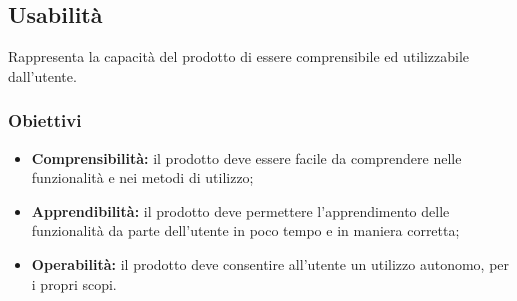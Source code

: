 %
%
%
%


\subsection{Usabilità}
Rappresenta la capacità del prodotto di essere comprensibile ed utilizzabile dall'utente.
\subsubsection{Obiettivi}
\begin{itemize}
	\item \textbf{Comprensibilità:} il prodotto deve essere facile da comprendere nelle funzionalità e nei metodi di utilizzo;
	\item \textbf{Apprendibilità:} il prodotto deve permettere l'apprendimento delle funzionalità da parte dell'utente in poco tempo e in maniera corretta;
	\item \textbf{Operabilità:} il prodotto deve consentire all'utente un utilizzo autonomo, per i propri scopi.
\end{itemize}
